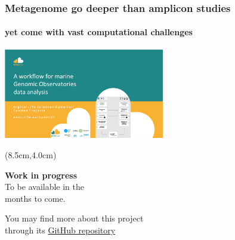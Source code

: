 \documentclass{beamer}
\begin{document}
   \begin{frame}
      \frametitle{Metagenome go deeper than amplicon studies}
      \framesubtitle{yet come with vast computational challenges}
      \includegraphics[width=70mm]{resources/marine-genomic-observatories.png}

      \begin{textblock*}{5cm}(8.5cm,4.0cm) %
            
         \textbf{Work in progress} \\
         To be available in the \\ months to come.

         \bigskip
         
         \footnotesize
         You may find more about this project  \\
         \footnotesize
         through its \href{https://github.com/emo-bon/pipeline-v5}{GitHub repository}

      \end{textblock*}


   \end{frame}





\end{document}
